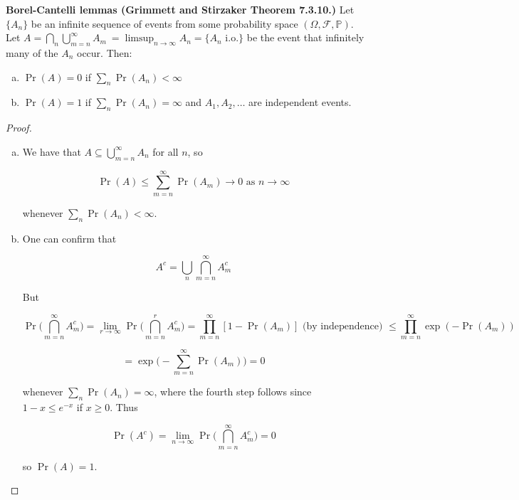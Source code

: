 \begin{theorem}\textbf{Borel-Cantelli lemmas (Grimmett and Stirzaker Theorem 7.3.10.)} \label{asym.borel} Let \(\{A_n\}\) be an infinite sequence of events from some probability space \((\Omega, \mathcal{F}, \mathbb{P})\). Let \(A = \bigcap_n \bigcup_{m=n}^\infty A_m\ = \limsup_{n \to \infty} A_n = \{A_n \text{ i.o.}\}\) be the event that infinitely many of the \(A_n\) occur. Then:

\begin{enumerate}[(a)]

\item \(\Pr(A) = 0 \) if \(\sum_n \Pr(A_n) < \infty\)

\item \(\Pr(A) = 1\) if \(\sum_n \Pr(A_n) = \infty\) and \(A_1, A_2, \ldots\) are independent events.

\end{enumerate}
\end{theorem}

\begin{proof}
\begin{enumerate}[(a)]

\item We have that \(A \subseteq \bigcup_{m=n}^\infty A_n\) for all \(n\), so

\[
\Pr(A) \leq \sum_{m=n}^\infty \Pr(A_m) \to 0 \text{ as } n \to \infty
\]

whenever \(\sum_n \Pr(A_n) < \infty\).

\item One can confirm that 

\[
A^c = \bigcup_n \bigcap_{m=n}^\infty A_m^c
\]

But 

\[
\Pr \bigg( \bigcap_{m=n}^\infty A_m^c \bigg) = \lim_{r \to \infty}\Pr \bigg( \bigcap_{m=n}^r A_m^c \bigg) = \prod_{m=n}^\infty[ 1 - \Pr(A_m)] \text{ (by independence) } \leq  \prod_{m=n}^\infty \exp(- \Pr(A_m)) 
\]

\[
= \exp \bigg(- \sum_{m=n}^\infty \Pr(A_m) \bigg) = 0
\]

whenever \(\sum_n \Pr(A_n) = \infty\), where the fourth step follows since \(1 - x \leq e^{-x}\) if \(x \geq 0\). Thus

\[
\Pr(A^c) = \lim_{n \to \infty} \Pr \bigg( \bigcap_{m=n}^\infty A_m^c \bigg) = 0
\]

so \(\Pr(A) = 1\).

\end{enumerate}
\end{proof}

